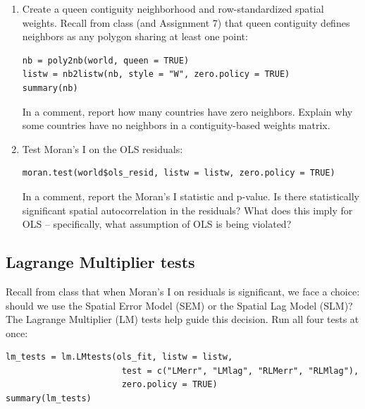 \begin{enumerate}[label=\alph*)]

  \item Create a queen contiguity neighborhood and row-standardized spatial weights. Recall from class (and Assignment 7) that queen contiguity defines neighbors as any polygon sharing at least one point:
  \begin{lstlisting}
nb = poly2nb(world, queen = TRUE)
listw = nb2listw(nb, style = "W", zero.policy = TRUE)
summary(nb)
  \end{lstlisting}
  In a comment, report how many countries have zero neighbors. Explain why some countries have no neighbors in a contiguity-based weights matrix.

  \item Test Moran's I on the OLS residuals:
  \begin{lstlisting}
moran.test(world$ols_resid, listw = listw, zero.policy = TRUE)
  \end{lstlisting}
  In a comment, report the Moran's I statistic and p-value. Is there statistically significant spatial autocorrelation in the residuals? What does this imply for OLS -- specifically, what assumption of OLS is being violated?

\end{enumerate}

\subsection{Lagrange Multiplier tests}

Recall from class that when Moran's I on residuals is significant, we face a choice: should we use the Spatial Error Model (SEM) or the Spatial Lag Model (SLM)? The Lagrange Multiplier (LM) tests help guide this decision. Run all four tests at once:

\begin{lstlisting}
lm_tests = lm.LMtests(ols_fit, listw = listw,
                       test = c("LMerr", "LMlag", "RLMerr", "RLMlag"),
                       zero.policy = TRUE)
summary(lm_tests)
\end{lstlisting}

